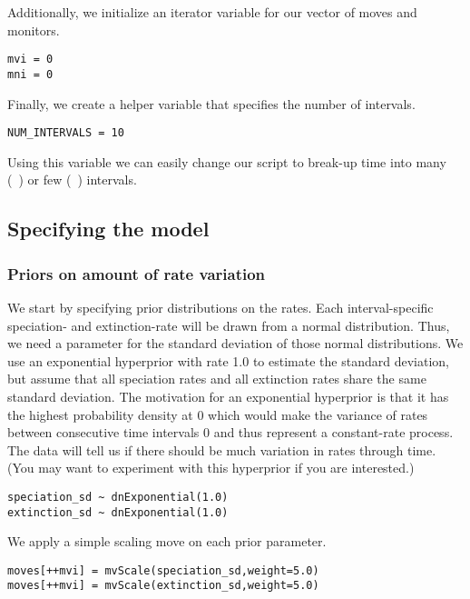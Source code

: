 Additionally, we initialize an iterator variable for our vector of moves and monitors.
{\tt \begin{snugshade*}
\begin{lstlisting}
mvi = 0
mni = 0
\end{lstlisting}
\end{snugshade*}}

Finally, we create a helper variable that specifies the number of intervals.
{\tt \begin{snugshade*}
\begin{lstlisting}
NUM_INTERVALS = 10
\end{lstlisting}
\end{snugshade*}}
Using this variable we can easily change our script to break-up time into many (\EG~) or few (\EG~) intervals.



\subsection{Specifying the model}

\subsubsection{Priors on amount of rate variation}
We start by specifying prior distributions on the rates.
Each interval-specific speciation- and extinction-rate will be drawn from a normal distribution.
Thus, we need a parameter for the standard deviation of those normal distributions.
We use an exponential hyperprior with rate 1.0 to estimate the standard deviation, but assume that all speciation rates and all extinction rates share the same standard deviation.
The motivation for an exponential hyperprior is that it has the highest probability density at 0 which would make the variance of rates between consecutive time intervals 0 and thus represent a constant-rate process.
The data will tell us if there should be much variation in rates through time.
(You may want to experiment with this hyperprior if you are interested.)
{\tt \begin{snugshade*}
\begin{lstlisting}
speciation_sd ~ dnExponential(1.0)
extinction_sd ~ dnExponential(1.0)
\end{lstlisting}
\end{snugshade*}}
We apply a simple scaling move on each prior parameter.
{\tt \begin{snugshade*}
\begin{lstlisting}
moves[++mvi] = mvScale(speciation_sd,weight=5.0)
moves[++mvi] = mvScale(extinction_sd,weight=5.0)
\end{lstlisting}
\end{snugshade*}}




